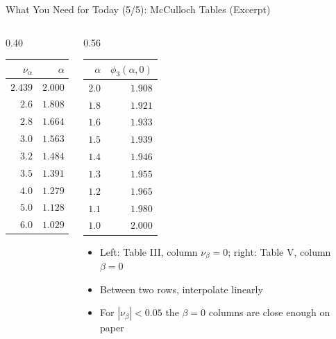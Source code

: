\begin{frame}{What You Need for Today (5/5): McCulloch Tables (Excerpt)}
\itemsize{\footnotesize}
\begin{columns}[T]
\begin{column}{0.40\textwidth}
\begin{center}
\footnotesize
\begin{tabular}{rr}
\toprule
$\nu_\alpha$ & $\alpha$ \\
\midrule
$2.439$ & $2.000$ \\
$2.6$ & $1.808$ \\
$2.8$ & $1.664$ \\
$3.0$ & $1.563$ \\
$3.2$ & $1.484$ \\
$3.5$ & $1.391$ \\
$4.0$ & $1.279$ \\
$5.0$ & $1.128$ \\
$6.0$ & $1.029$ \\
\bottomrule
\end{tabular}
\end{center}

\end{column}
\begin{column}{0.56\textwidth}
\begin{center}
\footnotesize
\begin{tabular}{rr}
\toprule
$\alpha$ & $\phi_3(\alpha, 0)$ \\
\midrule
$2.0$ & $1.908$ \\
$1.8$ & $1.921$ \\
$1.6$ & $1.933$ \\
$1.5$ & $1.939$ \\
$1.4$ & $1.946$ \\
$1.3$ & $1.955$ \\
$1.2$ & $1.965$ \\
$1.1$ & $1.980$ \\
$1.0$ & $2.000$ \\
\bottomrule
\end{tabular}
\end{center}
\begin{itemize}
    \item Left: Table III, column $\nu_\beta = 0$; right: Table V, column $\beta = 0$ 
    \item Between two rows, interpolate linearly
    \item For $|\nu_\beta| < 0.05$ the $\beta = 0$ columns are close enough on paper
\end{itemize}
\end{column}
\end{columns}
\end{frame}


